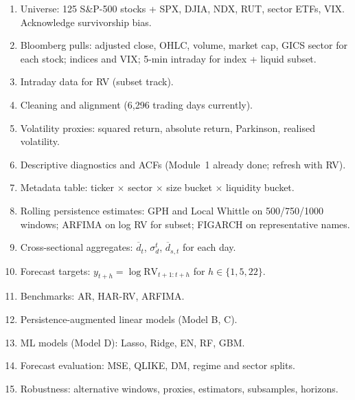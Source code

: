 \documentclass[11pt,a4paper]{article}
\begin{document}
\begin{enumerate}[label=\textbf{Step \arabic*.}]
  \item Universe: 125 S\&P-500 stocks + SPX, DJIA, NDX, RUT, sector ETFs,
  VIX. Acknowledge survivorship bias.
  \item Bloomberg pulls: adjusted close, OHLC, volume, market cap, GICS
  sector for each stock; indices and VIX; 5-min intraday for index + liquid
  subset.
  \item Intraday data for RV (subset track).
  \item Cleaning and alignment (6{,}296 trading days currently).
  \item Volatility proxies: squared return, absolute return, Parkinson,
  realised volatility.
  \item Descriptive diagnostics and ACFs (Module~1 already done; refresh
  with RV).
  \item Metadata table: ticker $\times$ sector $\times$ size bucket
  $\times$ liquidity bucket.
  \item Rolling persistence estimates: GPH and Local Whittle on 500/750/1000
  windows; ARFIMA on log RV for subset; FIGARCH on representative names.
  \item Cross-sectional aggregates: $\overline{d}_t$, $\sigma_d^t$,
  $\overline{d}_{s,t}$ for each day.
  \item Forecast targets: $y_{t+h}=\log\mathrm{RV}_{t+1:t+h}$ for
  $h\in\{1,5,22\}$.
  \item Benchmarks: AR, HAR-RV, ARFIMA.
  \item Persistence-augmented linear models (Model B, C).
  \item ML models (Model D): Lasso, Ridge, EN, RF, GBM.
  \item Forecast evaluation: MSE, QLIKE, DM, regime and sector splits.
  \item Robustness: alternative windows, proxies, estimators, subsamples,
  horizons.
\end{enumerate}
\end{document}
